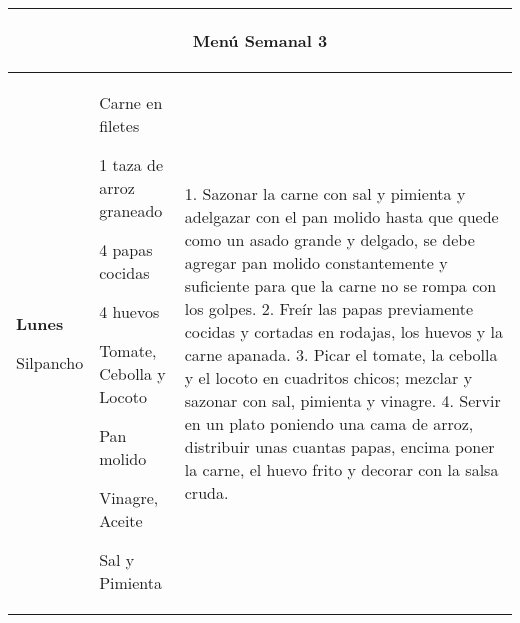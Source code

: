 \documentclass[menu.tex]{subfiles}
\begin{document}
\begin{tabular} {p{2cm} p{6cm} p{9.5cm}}
\multicolumn{3}{c}{\begin{LARGE}Menú Semanal 3\end{LARGE}}\\
\hline

\pbox{20cm}
{
    \rule{0pt}{3ex}\begin{large}\textbf{Lunes}\end{large}\\ 
    \rule{0pt}{2ex}Silpancho
} & 
\vspace{-0.4cm}
\begin{compactitem} 
    \begin{footnotesize}
        \item Carne en filetes
        \item 1 taza de arroz graneado
        \item 4 papas cocidas
        \item 4 huevos
        \item Tomate, Cebolla y Locoto
        \item Pan molido
        \item Vinagre, Aceite
        \item Sal y Pimienta
    \end{footnotesize}
\end{compactitem}&
\vspace{-0.4cm}
1. Sazonar la carne con sal y pimienta y adelgazar con el pan molido hasta que quede como un asado grande y delgado, se debe agregar pan molido constantemente y suficiente para que la carne no se rompa con los golpes.
2. Freír las papas previamente cocidas y cortadas en rodajas, los huevos y la carne apanada.     3. Picar el tomate, la cebolla y el locoto en cuadritos chicos; mezclar y sazonar con sal, pimienta y vinagre.
4. Servir en un plato poniendo una cama de arroz, distribuir unas cuantas papas, encima poner la carne, el huevo frito y decorar con la salsa cruda.\\
\hline


\end{tabular}
\end{document}

